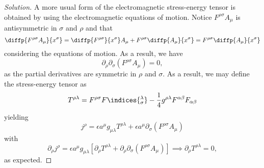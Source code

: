 \begin{proof}[Solution]
    A more usual form of the electromagnetic stress-energy tensor is obtained by using the electromagnetic equations of motion. Notice \(F^{\rho \sigma} A_\mu\) is antisymmetric in \(\sigma\) and \(\rho\) and that
    \begin{equation*}
        \diffp{F^{\rho \sigma} A_\mu}{x^\sigma} = \diffp{F^{\rho \sigma}}{x^\sigma} A_\mu + F^{\rho \sigma} \diffp{A_\mu}{x^\sigma} = F^{\rho \sigma} \diffp{A_\mu}{x^\sigma}
    \end{equation*}
    considering the equations of motion. As a result, we have
    \begin{equation*}
        \partial_{\rho}\partial_{\sigma} \left(F^{\rho \sigma} A_\mu\right) = 0,
    \end{equation*}
    as the partial derivatives are symmetric in \(\rho\) and \(\sigma\). As a result, we may define the stress-energy tensor as
    \begin{equation*}
        T^{\rho \lambda} = F^{\rho \sigma}F\indices{^\lambda_\sigma} - \frac14 g^{\rho \lambda} F^{\alpha \beta} F_{\alpha \beta}
    \end{equation*}
    yielding
    \begin{equation*}
        j^\rho = \epsilon a^\mu g_{\mu \lambda} T^{\rho \lambda} + \epsilon a^\mu \partial_\sigma (F^{\rho \sigma} A_\mu)
    \end{equation*}
    with
    \begin{equation*}
        \partial_\rho j^\rho = \epsilon a^\mu g_{\mu \lambda} \left[\partial_\rho T^{\rho \lambda} + \partial_{\rho} \partial_{\sigma} (F^{\rho \sigma} A_\mu)\right] \implies \partial_\rho T^{\rho \lambda} = 0,
    \end{equation*}
    as expected.
\end{proof}
